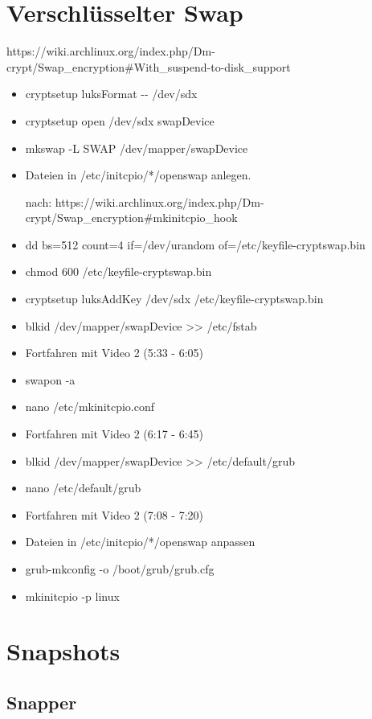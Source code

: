 \documentclass[11pt,a4paper]{article}
\begin{document}
\section{Verschlüsselter Swap}
https://wiki.archlinux.org/index.php/Dm-crypt/Swap\_encryption\#With\_suspend-to-disk\_support
\begin{itemize}
\item cryptsetup luksFormat -{}-\textcolor{red}{}  /dev/sdx

\item cryptsetup open /dev/sdx swapDevice
\item mkswap -L SWAP /dev/mapper/swapDevice
\item Dateien in /etc/initcpio/*/openswap anlegen.

nach: https://wiki.archlinux.org/index.php/Dm-crypt/Swap\_encryption\#mkinitcpio\_hook
\item dd bs=512 count=4 if=/dev/urandom of=/etc/keyfile-cryptswap.bin
\item chmod 600 /etc/keyfile-cryptswap.bin
\item cryptsetup luksAddKey /dev/sdx /etc/keyfile-cryptswap.bin
\item blkid /dev/mapper/swapDevice >{}> /etc/fstab
\item Fortfahren mit Video 2 (5:33 - 6:05)
\item swapon -a
\item nano /etc/mkinitcpio.conf 
\item Fortfahren mit Video 2 (6:17 - 6:45)
\item blkid /dev/mapper/swapDevice >{}> /etc/default/grub
\item nano /etc/default/grub
\item Fortfahren mit Video 2 (7:08 - 7:20)
\item Dateien in /etc/initcpio/*/openswap anpassen
\item grub-mkconfig -o /boot/grub/grub.cfg
\item mkinitcpio -p linux 
\end{itemize}

\section{Snapshots}

\subsection{Snapper}
\end{document}
